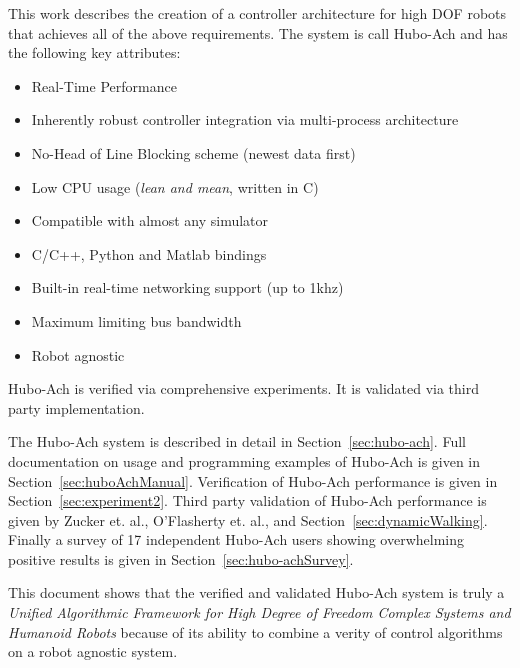 This work describes the creation of a controller architecture for high DOF robots that achieves all of the above requirements.
The system is call Hubo-Ach and has the following key attributes: 
\begin{itemize}
\item Real-Time Performance
\item Inherently robust controller integration via multi-process architecture 
\item No-Head of Line Blocking scheme (newest data first)
\item Low CPU usage (\textit{lean and mean}, written in C)
\item Compatible with almost any simulator
\item C/C++, Python and Matlab bindings
\item Built-in real-time networking support (up to 1khz)
\item Maximum limiting bus bandwidth
\item Robot agnostic
\end{itemize}

Hubo-Ach is verified via comprehensive experiments.
It is validated via third party implementation. 

The Hubo-Ach system is described in detail in Section~\ref{sec:hubo-ach}.
Full documentation on usage and programming examples of Hubo-Ach is given in Section~\ref{sec:huboAchManual}.
Verification of Hubo-Ach performance is given in Section~\ref{sec:experiment2}.
Third party validation of Hubo-Ach performance is given by Zucker et. al.\cite{tepraDoor2013}, O'Flasherty et. al.\cite{tepraCut2013}, and Section~\ref{sec:dynamicWalking}.
Finally a survey of 17 independent Hubo-Ach users showing overwhelming positive results is given in Section~\ref{sec:hubo-achSurvey}.

This document shows that the verified and validated Hubo-Ach system is truly a \textit{Unified Algorithmic Framework for High Degree of Freedom Complex Systems and Humanoid Robots} because of its ability to combine a verity of control algorithms on a robot agnostic system.

































